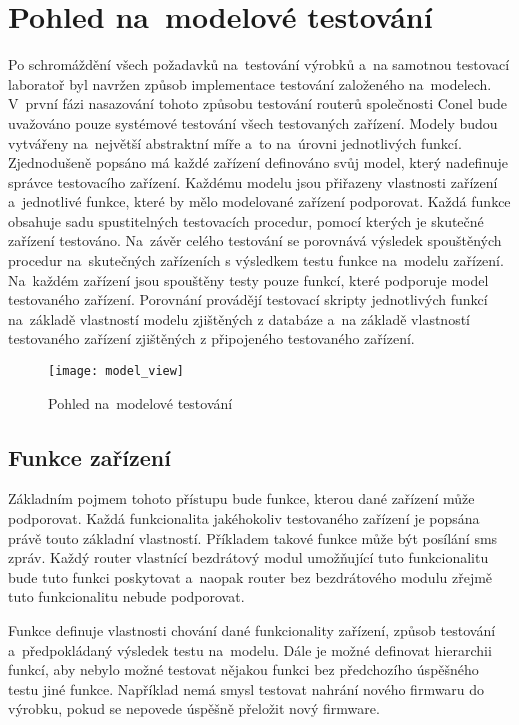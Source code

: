 \chapter{Pohled na~modelové testování}
Po schromáždění všech požadavků na~testování výrobků a~na samotnou testovací laboratoř byl navržen způsob implementace testování založeného na~modelech. V~první fázi nasazování tohoto způsobu testování routerů společnosti Conel bude uvažováno pouze systémové testování všech testovaných zařízení. Modely budou vytvářeny na~největší abstraktní míře a~to na~úrovni jednotlivých funkcí. Zjednodušeně popsáno má každé zařízení definováno svůj model, který nadefinuje správce testovacího zařízení. Každému modelu jsou přiřazeny vlastnosti zařízení a~jednotlivé funkce, které by mělo modelované zařízení podporovat. Každá funkce obsahuje sadu spustitelných testovacích procedur, pomocí kterých je skutečné zařízení testováno. Na~závěr celého testování se porovnává výsledek spouštěných procedur na~skutečných zařízeních s výsledkem testu funkce na~modelu zařízení. Na~každém zařízení jsou spouštěny testy pouze funkcí, které podporuje model testovaného zařízení. Porovnání provádějí testovací skripty jednotlivých funkcí na~základě vlastností modelu zjištěných z databáze a~na základě vlastností testovaného zařízení zjištěných z připojeného testovaného zařízení.

\begin{figure}[h]
  \centering
  \texttt{[image: model\_view]}
  \caption{Pohled na~modelové testování}
  \label{fig:model_view}
\end{figure}

\section{Funkce zařízení}
Základním pojmem tohoto přístupu bude funkce, kterou dané zařízení může podporovat. Každá funkcionalita jakéhokoliv testovaného zařízení je popsána právě touto základní vlastností. Příkladem takové funkce může být posílání sms zpráv. Každý router vlastnící bezdrátový modul umožňující tuto funkcionalitu bude tuto funkci poskytovat a~naopak router bez bezdrátového modulu zřejmě tuto funkcionalitu nebude podporovat.

Funkce definuje vlastnosti chování dané funkcionality zařízení, způsob testování a~předpokládaný výsledek testu na~modelu. Dále je možné definovat hierarchii funkcí, aby nebylo možné testovat nějakou funkci bez předchozího úspěšného testu jiné funkce. Například nemá smysl testovat nahrání nového firmwaru do výrobku, pokud se nepovede úspěšně přeložit nový firmware.

